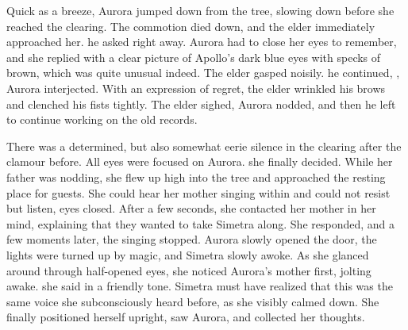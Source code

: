Quick as a breeze, Aurora jumped down from the tree, slowing down before she reached the clearing. The commotion died down, and the elder immediately approached her.  he asked right away. Aurora had to close her eyes to remember, and she replied with a clear picture of Apollo's dark blue eyes with specks of brown, which was quite unusual indeed. The elder gasped noisily.  he continued,  , Aurora interjected. With an expression of regret, the elder wrinkled his brows and clenched his fists tightly.  The elder sighed, Aurora nodded, and then he left to continue working on the old records.

There was a determined, but also somewhat eerie silence in the clearing after the clamour before. All eyes were focused on Aurora.  she finally decided. While her father was nodding, she flew up high into the tree and approached the resting place for guests. She could hear her mother singing within and could not resist but listen, eyes closed. After a few seconds, she contacted her mother in her mind, explaining that they wanted to take Simetra along. She responded, and a few moments later, the singing stopped. Aurora slowly opened the door, the lights were turned up by magic, and Simetra slowly awoke. As she glanced around through half-opened eyes, she noticed Aurora's mother first, jolting awake.  she said in a friendly tone. Simetra must have realized that this was the same voice she subconsciously heard before, as she visibly calmed down. She finally positioned herself upright, saw Aurora, and collected her thoughts.


